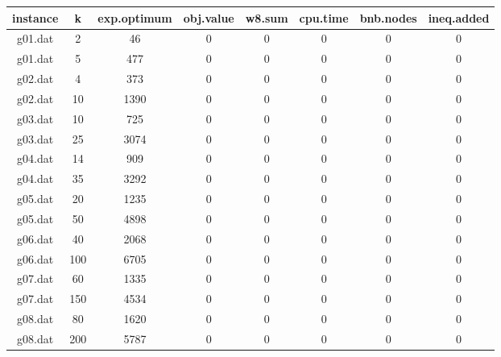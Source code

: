 \begin{tabular}{ c | c | c | c | c | c | c | c }
	instance & k & exp.optimum & obj.value & w8.sum & cpu.time & bnb.nodes & ineq.added \\
	\hline
	g01.dat & 2 & 46 & 0 & 0 & 0 & 0 & 0 \\
    g01.dat & 5 & 477 & 0 & 0 & 0 & 0 & 0 \\
	g02.dat & 4 & 373 & 0 & 0 & 0 & 0 & 0 \\
	g02.dat & 10 & 1390 & 0 & 0 & 0 & 0 & 0 \\
	g03.dat & 10 & 725 & 0 & 0 & 0 & 0 & 0 \\
	g03.dat & 25 & 3074 & 0 & 0 & 0 & 0 & 0 \\
	g04.dat & 14 & 909 & 0 & 0 & 0 & 0 & 0 \\
	g04.dat & 35 & 3292 & 0 & 0 & 0 & 0 & 0 \\
	g05.dat & 20 & 1235 & 0 & 0 & 0 & 0 & 0 \\
	g05.dat & 50 & 4898 & 0 & 0 & 0 & 0 & 0 \\
	g06.dat & 40 & 2068 & 0 & 0 & 0 & 0 & 0 \\
	g06.dat & 100 & 6705 & 0 & 0 & 0 & 0 & 0 \\
	g07.dat & 60 & 1335 & 0 & 0 & 0 & 0 & 0 \\
	g07.dat & 150 & 4534 & 0 & 0 & 0 & 0 & 0 \\
	g08.dat & 80 & 1620 & 0 & 0 & 0 & 0 & 0 \\
	g08.dat & 200 & 5787 & 0 & 0 & 0 & 0 & 0 \\

\end{tabular}
